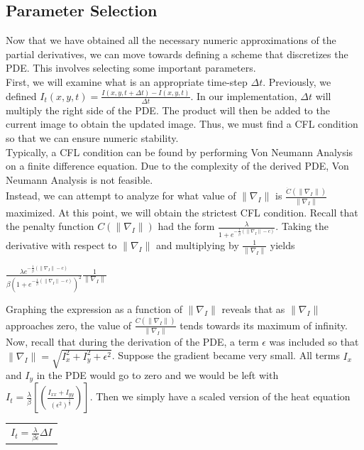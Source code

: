\documentclass{article}
\begin{document}
  \newpage
  \subsection{Parameter Selection}
  \noindent
  Now that we have obtained all the necessary numeric approximations of the partial derivatives, we
  can move towards defining a scheme that discretizes the PDE. This involves selecting
  some important parameters.\\

  \noindent
  First, we will examine what is an appropriate time-step $\Delta t$. Previously,
  we defined $I_{t}(x,y,t) = \frac{I(x,y,t+\Delta t) - I(x,y,t)}{\Delta t}$. In our implementation,
  $\Delta t$ will multiply the right side of the PDE. The product will then be added to
  the current image to obtain the updated image. Thus, we must find a CFL condition
  so that we can ensure numeric stability.\\

  \noindent
  Typically, a CFL condition can be found by performing Von Neumann Analysis on a finite
  difference equation. Due to the complexity of the derived PDE, Von Neumann Analysis
  is not feasible.\\

  \noindent
  Instead, we can attempt to analyze for what value of $\| \nabla_{I} \|$ is $\frac {\dot{C}(\| \nabla_{I} \|)}{\| \nabla_{I} \|}$ 
  maximized. At this point, we will obtain the strictest CFL condition. Recall that
  the penalty function $C(\| \nabla_{I} \|)$ had the form $\frac{\lambda}{1+e^{-\frac{1}{\beta}(\| \nabla_{I} \|-c)}}$.
  Taking the derivative with respect to $\| \nabla_{I} \|$ and multiplying by $\frac{1}{\| \nabla_{I}\|}$ yields
  \begin{center}
    $\frac{\lambda e^{-\frac{1}{\beta}(\| \nabla_{I} \|-c)}}{\beta(1+e^{-\frac{1}{\beta}(\| \nabla_{I} \|-c)})^2} \frac{1}{\| \nabla_{I} \|}$
  \end{center}
  Graphing the expression as a function of $\| \nabla_{I} \|$ reveals that as $\| \nabla_{I} \|$
  approaches zero, the value of $\frac {\dot{C}(\| \nabla_{I} \|)}{\| \nabla_{I} \|}$
  tends towards its maximum of infinity.\\
  
  \noindent
  Now, recall that during the derivation of
  the PDE, a term $\epsilon$ was included so that $\| \nabla_{I} \| = \sqrt{I_{x}^2 + I_{y}^2 + \epsilon^2}$.
  Suppose the gradient became very small. All terms $I_{x}$ and $I_{y}$ in the PDE would go to zero and 
  we would be left with $I_{t} = \frac{\lambda}{\beta}[(\frac{I_{xx}+I_{yy}}{(\epsilon^2)^\frac{1}{2}})]$.
  Then we simply have a scaled version of the heat equation
  \begin{center}
    \begin{tabular}{l}
      $I_{t} = \frac{\lambda}{\beta \epsilon}\Delta I$
    \end{tabular}
  \end{center}
\end{document}
